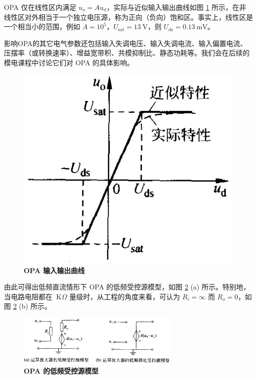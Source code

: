\documentclass[UTF8]{report}
\def\V{\ \mathrm{V}}
\def\mV{\ \mathrm{mV}}
\def\kO{\ \mathrm{K}\Omega}
\theoremstyle{MyLineTheoremStyle} %
\theoremstyle{MyBlockTheoremStyle} %
\theoremstyle{MySubsubsectionStyle} %
\begin{document}
\noindent\begin{minipage}{0.67\textwidth}
\hspace{2em}OPA 仅在线性区内满足 $u_o = Au_d$，实际与近似输入输出曲线如图 \ref{OPA 输入输出曲线} 所示，在非线性区对外相当于一个独立电压源，称为正向（负向）饱和区。事实上，线性区是一个相当小的范围，例如 $A = 10^5$，$U_\text{sat} = 13 \V$，则 $U_{\text{ds}} = 0.13 \mV$。 
    
\hspace{2em}影响OPA的其它电气参数还包括输入失调电压、输入失调电流、输入偏置电流、压摆率（或转换速率）、增益宽带积、共模抑制比、静态功耗等。我们会在后续的模电课程中讨论它们对 OPA 的具体影响。
\end{minipage}\hfill
\begin{minipage}{0.31\textwidth}
    \begin{figure}[H]\centering
        \includegraphics[width=\textwidth]{assets/1,2/image (49).jpg}
        \caption{\textbf{OPA 输入输出曲线}}\label{OPA 输入输出曲线}
        \end{figure}
\end{minipage}

由此可得出低频直流情形下 OPA 的低频受控源模型，如图 \ref{OPA 的低频受控源模型} (a) 所示。特别地，当电路电阻都在 $\kO$ 量级时，从工程的角度来看，可认为 $R_i = \infty$ 而 $R_o = 0$，如图 \ref{OPA 的低频受控源模型} (b) 所示。 

\begin{figure}[H]\centering
\includegraphics[width=0.7\textwidth]{assets/1,2/image (50).png}
\caption{\textbf{OPA 的低频受控源模型}}\label{OPA 的低频受控源模型}
\end{figure}
\end{document}
